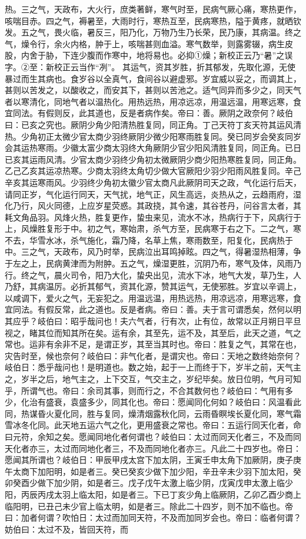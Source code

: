 \documentclass[a4paper,12pt,UTF8,twoside]{ctexbook}
\begin{document}
热。三之气，天政布，大火行，庶类著鲜，寒气时至，民病气厥心痛，寒热更作，咳喘目赤。四之气，褥暑至，大雨时行，寒热互至，民病寒热，隘于黄疼，就晒钦发。五之气，畏火临，暑反三，阳乃化，万物乃生乃长荣，民乃康，其病温。终之气，燥令行，余火内格，肿于上，咳喘甚则血溢。寒气数举，则露雾辍，病生皮股，内舍于胁，下连少腹而作寒中，地将易也。必抑①燥；新校正云乃“暑”之误字。②至：新校正云当作“冽”。
其运气，资其岁胜，折其郁发，先取化源，无使暴过而生其病也。食岁谷以全真气，食间谷以避虚邪。岁宜威以妥之，而调其上，甚则以苦发之，以酸收之，而安其下，甚则以苦池之。适气同异而多少之，同天气者以寒清化，同地气者以温热化。用热远热，用凉远凉，用温远温，用寒远寒，食宜同法。有假则反，此其道也，反是者病作矣。帝曰：善。厥阴之政奈何？岐伯曰：已亥之究也。厥阴少角少阳清热胜复同，同正角。丁己天符丁亥天符其运风清热。少角初正太微少官太商少羽终厥阴少微少阳寒雨胜复同。癸已同岁会癸亥同岁会其运热寒雨。少徽太富少商太羽终大角厥阴少官少阳风清胜复同，同正角。已日已亥其运雨风清。少官太商少羽终少角初太微厥阴少商少阳热寒胜复同，同正角。乙己乙亥其运凉热寒。少商太羽终太角切少做大官厥阳少羽少阳雨风胜复同。辛己辛亥其运寒雨风。少羽终少角初太徽少官太商凡此厥阴司天之政，气化运行后天，请同正岁，气化运行同天，天气扰，地气正，风生高远，炎热从之，云趋雨府，湿化乃行，风火同德，上应岁星荧惑。其政挠，其令速，其谷苍丹，问谷言太者，其耗文角品羽。风烽火热，胜复更作，蛰虫来见，流水不冰，热病行于下，风病行于上，风燥胜复形于中。初之气，寒始肃，杀气方至，民病寒于右之下。二之气，寒不去，华雪水冰，杀气施化，霜乃降，名草上焦，寒雨数至，阳复化，民病热于中。三之气，天政布，风乃时举，民病泣出耳鸣掉眩。四之气，得暑湿热相薄，争于左之上，民病黄津而为附肿。五之气，燥湿更胜，沉阴乃布，寒气及体，风雨乃行。终之气，晨火司令，阳乃大化，蛰央出见，流水下冰，地气大发，草乃生，人乃舒，其病温厉。必折其郁气，资其化源，赞其运气，无使邪胜。岁宜以辛调上，以咸调下，爱火之气，无妄犯之。用温远温，用热远热，用凉远凉，用寒远寒，食宜同法。有假反常，此之道也。反是者病。帝曰：善。夫于言可谓悉矣，然何以明其应乎？岐伯曰：昭乎哉问也！夫六气者，行有次，止有位，故常以正月朔日平旦视之，睹其位而知其所在矣。运有余，其至先，运不及，其至后，此天之道，气之常也。运非有余非不足，是谓正岁，其至当其时也。帝曰：胜复之气，其常在也，灾告时至，候也奈何？岐伯曰：非气化者，是谓灾也。帝曰：天地之数终始奈何？岐伯日：悉乎哉问也！是明道也。数之始，起于一上而终于下，岁半之前，天气主之，岁半之后，地气主之，上下交互，气交主之，岁纪毕矣。放日位明，气月可知乎，所谓气也。帝曰：余司其事，则而行之，不合其数何也？岐伯曰：气用有多少，化治有盛衰，袁盛多少，同其化也。帝曰：愿闻同化何如？岐伯曰：风温看此同，热谋昏火夏化同，胜与复同，燥清烟露秋化同，云雨昏瞑埃长夏化同，寒气霜雪冰冬化同。此天地五运六气之化，更用盛衰之常也。帝曰：五运行同天化者，命曰元符，余知之矣。愿闻同地化者何谓也？岐伯曰：太过而同天化者三，不及而同天化者亦三，太过而同地化者三，不及而同地化者亦三。凡此二十四岁也。帝日：愿闻其所谓也？岐伯日：甲辰甲戌太宫下加太阴，王寅壬申太角下加厥阴，庚子庚午太商下加阳明，如是者三。癸已癸亥少做下加少阳，辛丑辛未少羽下加太阳，癸卯癸酉少做下加少阴，如是者三。戊子戊午太激上临少阴，戊寅戊申太激上临少阳，丙辰丙戌太羽上临太阳，如是者三。下已丁亥少角上临厥阴，乙卯乙酉少商上临阳明，已丑己未少官上临太明，如是者三。除此二十四岁，则不加不临也。帝曰：加者何谓？吹怕日：太过而加同天符，不及而加同岁会也。帝曰：临者何谓？妨伯曰：太过不及，皆回天符，而
\end{document}
